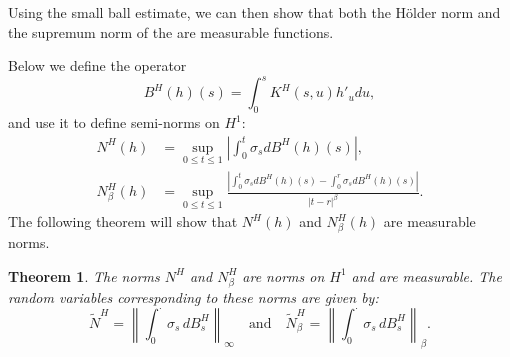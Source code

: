 \documentclass[preprint,12pt]{elsarticle}
\newtheorem{theorem}{Theorem}[section]
\theoremstyle{definition}  %
\theoremstyle{plain}  %
\begin{document}
	
	
Using the small ball estimate, we can then show that both the H\"older norm 
and the supremum norm of the  are measurable functions.


                  Below we define the operator 
\begin{equation*}
	B^H(h)(s) = \int_0^s K^H(s,u) h'_u  du,
\end{equation*}
and use it to define semi-norms on $H^1$:
\begin{align*}
	N^H(h) &= \sup_{0 \leq t \leq 1} \left| \int_0^t \sigma_s  dB^H(h)(s) \right|, \\
	N^H_\beta(h) &= \sup_{0 \leq t \leq 1} \frac{\left| \int_0^t \sigma_s  dB^H(h)(s) - \int_0^r \sigma_s  dB^H(h)(s) \right|}{|t - r|^\beta}.
\end{align*}
The following theorem will show that $N^H(h)$ and $N^H_\beta(h)$ are measurable norms.  

\begin{theorem}  \label{measurable norm}
    The norms \( N^H \) and \( N^H_\beta \) are norms on \( H^1 \) and are measurable.
The random variables corresponding to these norms are given by:
\[
\widetilde{N}^H = \left\| \int_0^{\cdot} \sigma_s \, dB^H_s \right\|_{\infty} \quad \text{and} \quad \widetilde{N}^H_\beta = \left\| \int_0^{\cdot} \sigma_s \, dB^H_s \right\|_{\beta}.
\]
\end{theorem}
\end{document}
